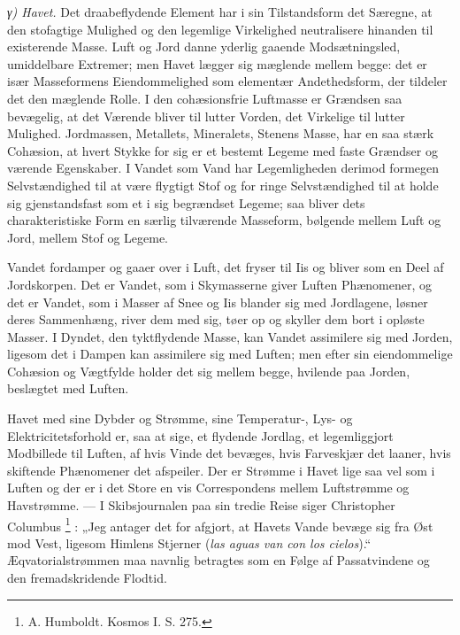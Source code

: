\documentclass[12pt,a4paper]{book}
\newcommand{\subrunin}[1]{\emph{#1}\hspace{0.4em}}
\begin{document}
\subrunin{γ) Havet.} Det draabeflydende Element har i sin Tilstandsform
det Særegne, at den stofagtige Mulighed og
den legemlige Virkelighed neutralisere hinanden til existerende Masse.
Luft og Jord danne yderlig gaaende Modsætningsled, umiddelbare Extremer;
men Havet lægger sig mæglende mellem begge: det er især Masseformens
Eiendommelighed som elementær Andethedsform, der tildeler det den
mæglende Rolle. I den cohæsionsfrie Luftmasse er Grændsen saa bevægelig,
at det Værende bliver til lutter Vorden, det Virkelige til lutter
Mulighed. Jordmassen, Metallets, Mineralets, Stenens Masse, har en saa
stærk Cohæsion, at hvert Stykke for sig er et bestemt Legeme med faste
Grændser og værende Egenskaber. I Vandet som Vand har Legemligheden
derimod formegen Selvstændighed til at være flygtigt Stof og for ringe
Selvstændighed til at holde sig gjenstandsfast som et i sig begrændset
Legeme; saa bliver dets charakteristiske Form en særlig tilværende
Masseform, bølgende mellem Luft og Jord, mellem Stof og Legeme.

Vandet fordamper og gaaer over i Luft, det fryser til Iis og bliver som
en Deel af Jordskorpen. Det er Vandet, som i Skymasserne giver Luften
Phænomener, og det er Vandet, som i Masser af Snee og Iis blander sig med
Jordlagene, løsner deres Sammenhæng, river dem med sig, tøer op og
skyller dem bort i opløste Masser. I Dyndet, den tyktflydende Masse, kan
Vandet assimilere sig med Jorden, ligesom det i Dampen kan assimilere sig
med Luften; men efter sin eiendommelige Cohæsion og Vægtfylde holder det
sig mellem begge, hvilende paa Jorden, beslægtet med Luften.

Havet med sine Dybder og Strømme, sine Temperatur-, Lys- og
Elektricitetsforhold er, saa at sige, et flydende Jordlag, et
legemliggjort Modbillede til Luften, af hvis Vinde det bevæges, hvis
Farveskjær det laaner, hvis skiftende Phænomener det afspeiler. Der er
Strømme i Havet lige saa vel som i Luften og der er i det Store en vis
Correspondens mellem Luftstrømme og Havstrømme. --- I Skibsjournalen
paa sin tredie Reise siger Christopher Columbus%
\footnote{%
A. Humboldt. Kosmos I. S. 275.}%
: „Jeg antager det for afgjort, at Havets Vande bevæge sig fra Øst mod
Vest, ligesom Himlens Stjerner (\textit{las aguas van con los
cielos}).“ Æqvatorialstrømmen maa navnlig betragtes som en Følge af
Passatvindene og den fremadskridende Flodtid.
\end{document}
